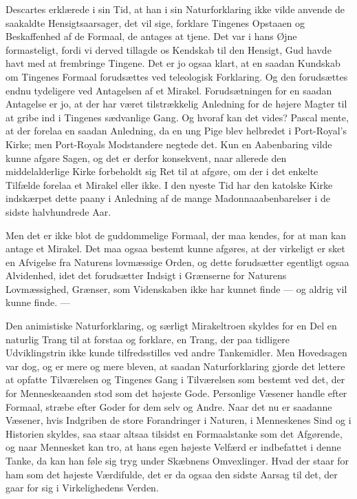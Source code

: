 \documentclass[12pt,a4paper]{article}
\newcommand{\opage}[1]{\marginnote{\footnotesize\textit{[#1]}}}
\begin{document}
Descartes erklærede i sin Tid, at han i sin Naturforklaring ikke vilde
anvende de saakaldte Hensigtsaarsager, det vil sige, forklare Tingenes
Opstaaen og Beskaffenhed af de Formaal, de antages at tjene. Det var i hans
Øjne formasteligt, fordi vi derved tillagde os Kendskab til den Hensigt, Gud
havde havt med at frembringe Tingene. Det er jo ogsaa klart, at en saadan
Kundskab om Tingenes Formaal forudsættes ved teleologisk Forklaring. Og den
forudsættes endnu tydeligere ved Antagelsen af et Mirakel. Forudsætningen
for en saadan Antagelse er jo, at der har været tilstrækkelig Anledning for
de højere Magter til at gribe ind i Tingenes sædvanlige Gang. Og hvoraf kan
det vides? Pascal mente, at der forelaa en saadan Anledning, da en ung Pige
blev helbredet i Port-Royal's Kirke; men Port-Royals Modstandere negtede
det. Kun en Aabenbaring vilde kunne afgøre Sagen, og det er derfor
konsekvent, naar allerede den middelalderlige Kirke forbeholdt sig Ret til at
afgøre, om der i det enkelte Tilfælde forelaa et Mirakel eller ikke. I den
nyeste Tid har den katolske Kirke indskærpet dette paany i Anledning af de
mange Madonnaaabenbarelser i de sidste halvhundrede Aar.

Men det er ikke blot de guddommelige Formaal, der maa kendes, for at man kan
antage et Mirakel. Det maa ogsaa bestemt kunne afgøres, at der virkeligt er
sket en Afvigelse fra Naturens lovmæssige Orden, og dette forudsætter
egentligt ogsaa Alvidenhed, idet det forudsætter \opage{32} Indsigt i Grænserne for
Naturens Lovmæssighed, Grænser, som Videnskaben ikke har kunnet finde --- og
aldrig vil kunne finde. ---

Den animistiske Naturforklaring, og særligt Mirakeltroen skyldes for en Del
en naturlig Trang til at forstaa og forklare, en Trang, der paa tidligere
Udviklingstrin ikke kunde tilfredsstilles ved andre Tankemidler. Men
Hovedsagen var dog, og er mere og mere bleven, at saadan Naturforklaring
gjorde det lettere at opfatte Tilværelsen og Tingenes Gang i Tilværelsen som
bestemt ved det, der for Menneskeaanden stod som det højeste Gode. Personlige
Væsener handle efter Formaal, stræbe efter Goder for dem selv og Andre. Naar
det nu er saadanne Væsener, hvis Indgriben de store Forandringer i Naturen, i
Menneskenes Sind og i Historien skyldes, saa staar altsaa tilsidst en
Formaalstanke som det Afgørende, og naar Mennesket kan tro, at hans egen
højeste Velfærd er indbefattet i denne Tanke, da kan han føle sig tryg under
Skæbnens Omvexlinger. Hvad der staar for ham som det højeste Værdifulde, det
er da ogsaa den sidste Aarsag til det, der gaar for sig i Virkelighedens
Verden.
\end{document}
